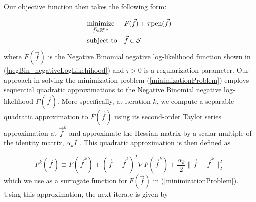 \noindent Our objective function then takes the following form:

\begin{equation} \label{minimizationProblem}
	\begin{aligned}
		& \underset{\vec{f} \in \mathbb{R}^{6n}}{\text{minimize}}
		& & F(\vec{f}) + \tau \text{pen}(\vec{f}) \\
		& \text{subject to}
		& & \vec{f} \in \mathcal{S}
	\end{aligned}
\end{equation}
where $F(\vec{f})$ is the Negative Binomial negative log-likelihood function shown in (\ref{negBin_negativeLogLikehihood}) and $\tau > 0 $ is a regularization parameter. Our approach in solving the minimization problem (\ref{minimizationProblem}) employs sequential quadratic approximations to the Negative Binomial negative log-likelihood $F(\vec{f})$. More specifically, at iteration $k$, we compute a separable quadratic approximation to $F(\vec{f})$ using its second-order Taylor series approximation at $\vec{f}^k$ and approximate the Hessian matrix by a scalar multiple of the identity matrix, $\alpha_k I$ \cite{Marcia_SPIRALTAP}. This quadratic approximation is then defined as

\begin{equation*}
	F^k (\vec{f}) \equiv F(\vec{f}^k) + (\vec{f} - \vec{f}^k)^T \nabla F(\vec{f}^k) + \frac{\alpha_k}{2} \|\vec{f} - \vec{f}^k\|_2^2
\end{equation*}
which we use as a surrogate function for $F(\vec{f})$ in (\ref{minimizationProblem}). Using this approximation, the next iterate is given by 

